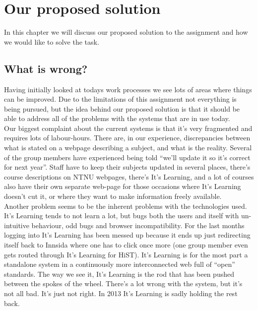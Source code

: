 \section{Our proposed solution}

In this chapter we will discuss our proposed solution to the assignment and how we would like to solve the task. 

\subsection{What is wrong?}
Having initially looked at todays work processes we see lots of areas where things can be improved. Due to the limitations of this assignment not everything
is being pursued, but the idea behind our proposed solution is that it should be able to address all of the problems with the systems that are in use today.\\

\noindent
Our biggest complaint about the current systems is that it's very fragmented and requires lots of labour-hours. There are, in our experience, discrepancies between what is 
stated on a webpage describing a subject, and what is the reality. Several of the group members have experienced being told ``we'll update it so it's correct for next year''. 
Staff have to keep their subjects updated in several places, there's course descriptions on NTNU webpages, there's It's Learning, and a lot of courses also have their own separate
web-page for those occasions where It's Learning doesn't cut it, or where they want to make information freely available.\\

\noindent
Another problem seems to be the inherent problems with the technologies used. It's Learning tends to not learn a lot, but bugs both the users and itself with un-intuitive behaviour, 
odd bugs and browser incompatibility. For the last months logging into It's Learning has been messed up because it ends up just redirecting itself back to Innsida where one has to 
click once more (one group member even gets routed through It's Learning for HiST). It's Learning is for the most part a standalone system in a continuously more interconnected web full of ``open'' standards. The way we see it, It's Learning is the 
rod that has been pushed between the spokes of the wheel. There's a lot wrong with the system, but it's not all bad. It's just not right. In 2013 It's Learning is sadly holding the 
rest back. 

